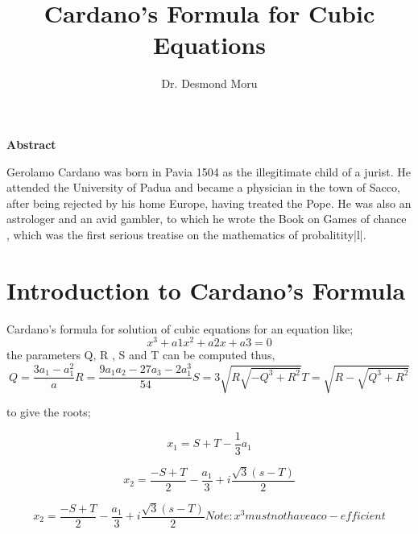 \documentclass{article}
\begin{document}
	\author{Dr. Desmond Moru}
	\title{Cardano's Formula for Cubic Equations}
	\maketitle


	
	\begin{center}
		\textbf{Abstract}
	\end{center}
   Gerolamo Cardano was born in Pavia 1504 as the illegitimate child of a jurist. He attended the University of Padua and became a physician in the town of Sacco, after being rejected by his home Europe, having treated the Pope. He was also an astrologer and an avid gambler, to which he wrote the Book on Games of chance , which was the first serious treatise on the mathematics of probalitity|l|.
   
   \section{ Introduction to Cardano's Formula}
  Cardano's formula for solution of cubic equations for an equation like;
  \begin{equation}
  	x^3 + a1x^2 + a2x + a3 = 0
  \end{equation}
the parameters Q, R , S and T can be computed thus,
\begin{equation}
	Q=  \frac{3a_{1}-a_{1}^2}{a}          R=\frac{9a_{1}a_{2}-27a_{3}-2a_{1}^3}{54}
	S=3\sqrt{R\sqrt{-Q^3 + R^2}}
T=\sqrt{R-\sqrt{Q^3 + R^2}}

\end{equation}

to give the roots;

\begin{flushleft}
\begin{equation}
	x_{1} = S + T-\frac{1}{3}a_{1}
	\end{equation}
	\end{flushleft}
\begin{flushleft}
	\begin{equation}
x_{2}=\frac{-S+T}{2} - \frac{a_1}{3} + i\frac{\sqrt{3}(s-T)}{2}
	\end{equation}
\end{flushleft}

	\begin{equation}
		x_{2}=\frac{-S+T}{2} - \frac{a_1}{3} + i\frac{\sqrt{3}(s-T)}{2}
		Note : x^3  must not have a co-efficient
			\end{equation}

	
\end{document}
